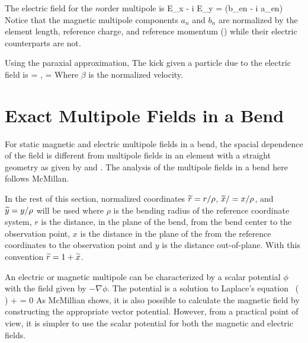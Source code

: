 The electric field for the $n$\Th order multipole is
\Begineq
  E_x - i E_y = (b_{en} - i a_{en}) \, 
  \label{exiey}
\Endeq
Notice that the magnetic multipole components $a_n$ and $b_n$ are normalized by the
element length, reference charge, and reference momentum () while their electric
counterparts are not.

Using the paraxial approximation, The kick given a particle due to the electric field is
\Begineq
   = , \qquad {} = 
\Endeq
Where $\beta$ is the normalized velocity.

\section{Exact Multipole Fields in a Bend}
\label{s:field.exact}

For static magnetic and electric multipole fields in a bend, the spacial dependence of the
field is different from multipole fields in an element with a straight geometry as given
by  and . The analysis of the multipole fields in a bend here follows
McMillan\cite{b:mcmillan}.  

In the rest of this section, normalized coordinates ${\widetilde r} = r / \rho$, ${\widetilde x} / = x /
\rho$, and ${\widetilde y} = y / \rho$ will be used where $\rho$ is the bending radius of the
reference coordinate system, $r$ is the distance, in the plane of the bend, from the bend
center to the observation point, $x$ is the distance in the plane of the from the reference
coordinates to the observation point and $y$ is the distance out-of-plane. With this
convention ${\widetilde r} = 1 + {\widetilde x}$.

An electric or magnetic multipole can be characterized by a scalar potential $\phi$ with
the field given by $-\nabla \phi$.  The potential is a solution to Laplace's equation
\Begineq
   \, \frac{\partial}{\partial \, \rw} 
  \left( \rw \, \frac{\partial \, \phi}{\partial \, \rw} \right) +
   = 0
\Endeq
As McMillian shows, it is also possible to calculate the magnetic field by constructing the
appropriate vector potential. However, from a practical point of view, it is simpler to use the
scalar potential for both the magnetic and electric fields.

